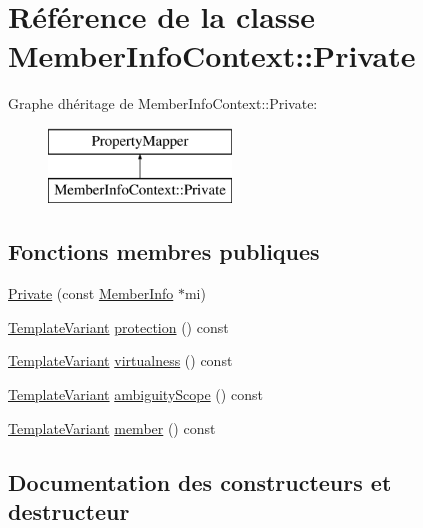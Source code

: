 \hypertarget{class_member_info_context_1_1_private}{}\section{Référence de la classe Member\+Info\+Context\+:\+:Private}
\label{class_member_info_context_1_1_private}
Graphe d\textquotesingle{}héritage de Member\+Info\+Context\+:\+:Private\+:\begin{figure}[H]
\begin{center}
\leavevmode
\includegraphics[height=2.000000cm]{class_member_info_context_1_1_private}
\end{center}
\end{figure}
\subsection*{Fonctions membres publiques}
\begin{DoxyCompactItemize}
\item 
\hyperlink{class_member_info_context_1_1_private_a200c99bbbd9049464b7f2e8e4b3a4597}{Private} (const \hyperlink{struct_member_info}{Member\+Info} $\ast$mi)
\item 
\hyperlink{class_template_variant}{Template\+Variant} \hyperlink{class_member_info_context_1_1_private_aa5b3af2c5147c38e2a726f9e0700032f}{protection} () const 
\item 
\hyperlink{class_template_variant}{Template\+Variant} \hyperlink{class_member_info_context_1_1_private_aefd73177af99aac7638c1da18a3d77f7}{virtualness} () const 
\item 
\hyperlink{class_template_variant}{Template\+Variant} \hyperlink{class_member_info_context_1_1_private_a0c8f25750cb1df00a90df0e4f398018c}{ambiguity\+Scope} () const 
\item 
\hyperlink{class_template_variant}{Template\+Variant} \hyperlink{class_member_info_context_1_1_private_a14776427bc46f0aaf14fd3c9993d7b75}{member} () const 
\end{DoxyCompactItemize}


\subsection{Documentation des constructeurs et destructeur}
\hypertarget{class_member_info_context_1_1_private_a200c99bbbd9049464b7f2e8e4b3a4597}{}
